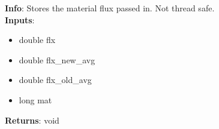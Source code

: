 \textbf{Info}: Stores the material flux passed in. Not thread safe. \\

\noindent \textbf{Inputs}:
\begin{itemize}
\item{double flx}
\item{double flx\_new\_avg}
\item{double flx\_old\_avg}
\item{long mat}
\end{itemize}

\noindent \textbf{Returns}: void
